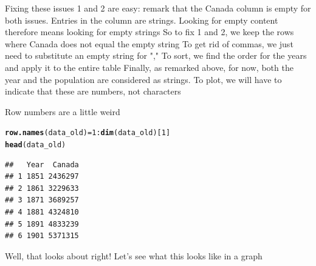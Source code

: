 \documentclass[aspectratio=169]{beamer}\usepackage[]{graphicx}\usepackage[]{xcolor}
\makeatletter
\newcommand{\hlnum}[1]{\textcolor[rgb]{0.686,0.059,0.569}{#1}}%
\newcommand{\hlsng}[1]{\textcolor[rgb]{0.192,0.494,0.8}{#1}}%
\newcommand{\hlopt}[1]{\textcolor[rgb]{0,0,0}{#1}}%
\newcommand{\hldef}[1]{\textcolor[rgb]{0.345,0.345,0.345}{#1}}%
\newcommand{\hlkwb}[1]{\textcolor[rgb]{0.69,0.353,0.396}{#1}}%
\newcommand{\hlkwd}[1]{\textcolor[rgb]{0.737,0.353,0.396}{\textbf{#1}}}%
\newenvironment{kframe}{%
 \def\at@end@of@kframe{}%
 \ifinner\ifhmode%
  \def\at@end@of@kframe{\end{minipage}}%
  \begin{minipage}{\columnwidth}%
 \fi\fi%
 \def\FrameCommand##1{\hskip\@totalleftmargin \hskip-\fboxsep
 \colorbox{shadecolor}{##1}\hskip-\fboxsep
     \hskip-\linewidth \hskip-\@totalleftmargin \hskip\columnwidth}%
 \MakeFramed {\advance\hsize-\width
   \@totalleftmargin\z@ \linewidth\hsize
   \@setminipage}}%
 {\par\unskip\endMakeFramed%
 \at@end@of@kframe}
\newenvironment{knitrout}{}{} %
\makeatother
\begin{document}
\begin{frame}{Fixing these issues}
1 and 2 are easy: remark that the Canada column is empty for both issues. Entries in the column are strings. Looking for empty content therefore means looking for empty strings
\vfill
So to fix 1 and 2, we keep the rows where Canada does not equal the empty string
\vfill
To get rid of commas, we just need to substitute an empty string for ","
\vfill
To sort, we find the order for the years and apply it to the entire table
\vfill
Finally, as remarked above, for now, both the year and the population are considered as strings. To plot, we will have to indicate that these are numbers, not characters
\end{frame}



\begin{frame}[fragile]
Row numbers are a little weird
\begin{knitrout}
\color{fgcolor}\begin{kframe}
\begin{alltt}
\hlkwd{row.names}\hldef{(data_old)} \hlkwb{=} \hlnum{1}\hlopt{:}\hlkwd{dim}\hldef{(data_old)[}\hlnum{1}\hldef{]}
\hlkwd{head}\hldef{(data_old)}
\end{alltt}
\begin{verbatim}
##   Year  Canada
## 1 1851 2436297
## 2 1861 3229633
## 3 1871 3689257
## 4 1881 4324810
## 5 1891 4833239
## 6 1901 5371315
\end{verbatim}
\end{kframe}
\end{knitrout}

Well, that looks about right! Let's see what this looks like in a graph
\end{frame}
\end{document}
